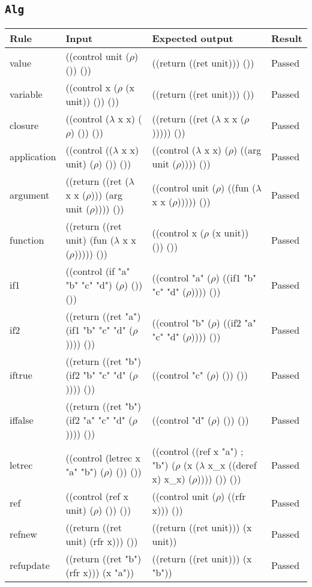 \documentclass[12pt,a4paper,twoside,openright]{report}
\begin{document}
\subsection{\texttt{Alg}}
\begin{longtable}{| p{2.5cm} | p{5.5cm} |  p{5.5cm} | p{1.5cm} |}
\hline
\textbf{Rule} & \textbf{Input} & \textbf{Expected output} & \textbf{Result} \\ \hline
value & ((control unit ($\rho$) ()) ()) & ((return ((ret unit))) ()) & Passed \\ \hline
variable & ((control x ($\rho$ (x unit)) ()) ()) & ((return ((ret unit))) ()) & Passed \\ \hline
closure & ((control ($\lambda$ x x) ($\rho$) ()) ()) & ((return ((ret ($\lambda$ x x ($\rho$))))) ()) & Passed \\ \hline
application & ((control (($\lambda$ x x) unit) ($\rho$) ()) ()) & ((control ($\lambda$ x x) ($\rho$) ((arg unit ($\rho$)))) ()) & Passed \\ \hline
argument & ((return ((ret ($\lambda$ x x ($\rho$))) (arg unit ($\rho$)))) ()) & ((control unit ($\rho$) ((fun ($\lambda$ x x ($\rho$))))) ()) & Passed \\ \hline
function & ((return ((ret unit) (fun ($\lambda$ x x ($\rho$))))) ()) & ((control x ($\rho$ (x unit)) ()) ()) & Passed \\ \hline
if1 & ((control (if "a" "b" "c" "d") ($\rho$) ()) ()) & ((control "a" ($\rho$) ((if1 "b" "c" "d" ($\rho$)))) ()) & Passed \\ \hline
if2 & ((return ((ret "a") (if1 "b" "c" "d" ($\rho$)))) ()) & ((control "b" ($\rho$) ((if2 "a" "c" "d" ($\rho$)))) ()) & Passed \\ \hline
iftrue & ((return ((ret "b") (if2 "b" "c" "d" ($\rho$)))) ()) & ((control "c" ($\rho$) ()) ()) & Passed \\ \hline
iffalse & ((return ((ret "b") (if2 "a" "c" "d" ($\rho$)))) ()) & ((control "d" ($\rho$) ()) ()) & Passed \\ \hline
letrec & ((control (letrec x "a" "b") ($\rho$) ()) ()) & ((control ((ref x "a") ; "b") ($\rho$ (x ($\lambda$ x\_x ((deref x) x\_x) ($\rho$)))) ()) ()) & Passed \\ \hline
ref & ((control (ref x unit) ($\rho$) ()) ()) & ((control unit ($\rho$) ((rfr x))) ()) & Passed \\ \hline
refnew & ((return ((ret unit) (rfr x))) ()) & ((return ((ret unit))) (x unit)) & Passed \\ \hline
refupdate & ((return ((ret "b") (rfr x))) (x "a")) & ((return ((ret unit))) (x "b")) & Passed \\ \hline

\end{longtable}
\end{document}
